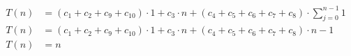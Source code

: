 \begin{subequations}
\begin{align}
\label{eq:findlinesegments1}
T(n)& = (c_{1} + c_{2} + c_{9} + c_{10}) \cdot 1 + c_{3} \cdot n + (c_{4} + c_{5} + c_{6} + c_{7} + c_{8}) \cdot
 \sum_{j=0}^{n-1} 1\\
\label{eq:findlinesegments2}
T(n)& = (c_{1} + c_{2} + c_{9} + c_{10}) \cdot 1 + c_{3} \cdot n + (c_{4} + c_{5} + c_{6} + c_{7} + c_{8}) \cdot
 n-1\\
\label{eq:findlinesegments3}
T(n)& = n
\end{align}
\end{subequations}
